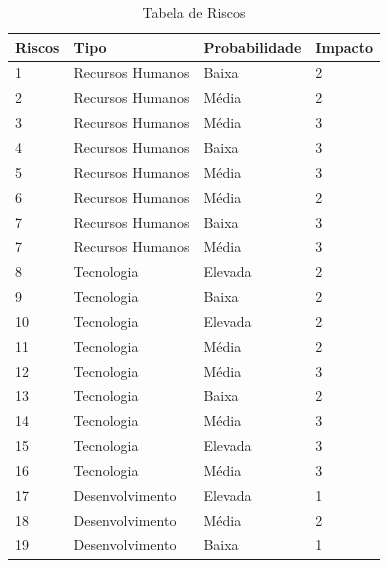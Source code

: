 \documentclass[12pt, a4paper, twoside]{report} %
\begin{document}
\begin{table}[h]
\centering
\begin{tabular}{|l|l l l|}
\hline
Riscos                              & Tipo             & Probabilidade & Impacto \\ \hline
1				                    & Recursos Humanos & Baixa         & 2       \\ \hline
2                               	& Recursos Humanos & Média         & 2       \\ \hline
3                                	& Recursos Humanos & Média         & 3       \\ \hline
4                          			& Recursos Humanos & Baixa         & 3       \\ \hline
5             						& Recursos Humanos & Média         & 3       \\ \hline
6                            		& Recursos Humanos & Média         & 2       \\ \hline
7                     				& Recursos Humanos & Baixa         & 3       \\ \hline
7                     				& Recursos Humanos & Média         & 3       \\ \hline
8        							& Tecnologia       & Elevada       & 2       \\ \hline
9 									& Tecnologia       & Baixa         & 2       \\ \hline
10                   				& Tecnologia       & Elevada       & 2       \\ \hline
11                  				& Tecnologia       & Média		   & 2       \\ \hline
12 									& Tecnologia       & Média         & 3       \\ \hline
13                                	& Tecnologia       & Baixa         & 2       \\ \hline
14                                	& Tecnologia       & Média         & 3       \\ \hline
15                                	& Tecnologia       & Elevada       & 3       \\ \hline
16                                	& Tecnologia       & Média         & 3       \\ \hline
17                                	& Desenvolvimento  & Elevada       & 1       \\ \hline
18                                	& Desenvolvimento  & Média         & 2       \\ \hline
19                                	& Desenvolvimento  & Baixa         & 1       \\ \hline
\end{tabular}
\caption{Tabela de Riscos}
\label{riscos}
\end{table}
\end{document}
